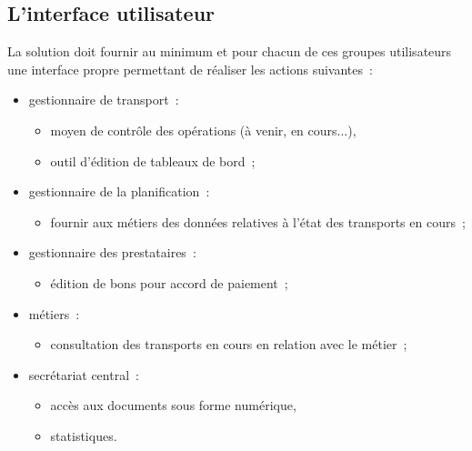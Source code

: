 \subsection{L'interface utilisateur}
La solution doit fournir au minimum et pour chacun de ces groupes utilisateurs une interface propre permettant de réaliser les actions suivantes~:
\begin{itemize}
	\item gestionnaire de transport~:
	\begin{itemize}
		\item moyen de contrôle des opérations (à venir, en cours...),
		\item outil d'édition de tableaux de bord~;
	\end{itemize}
	\item gestionnaire de la planification~:
	\begin{itemize}
		\item fournir aux métiers des données relatives à l'état des transports en cours~;
	\end{itemize}
	\item gestionnaire des prestataires~:
	\begin{itemize}
		\item édition de bons pour accord de paiement~;
	\end{itemize}
	\item métiers~:
	\begin{itemize}
		\item consultation des transports en cours en relation avec le métier~;
	\end{itemize}
	\item secrétariat central~:
	\begin{itemize}
		\item accès aux documents sous forme numérique,
		\item statistiques.
	\end{itemize}
\end{itemize}

